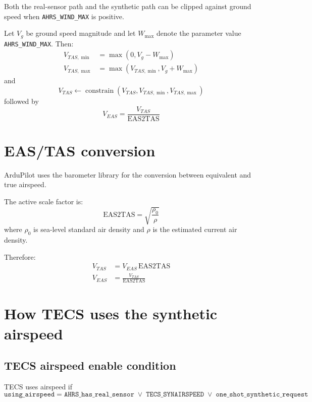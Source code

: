 \documentclass[11pt]{article}
\begin{document}
Both the real-sensor path and the synthetic path can be clipped against ground speed when \texttt{AHRS\_WIND\_MAX} is positive.

Let $V_g$ be ground speed magnitude and let $W_{\max}$ denote the parameter value \texttt{AHRS\_WIND\_MAX}. Then:
\begin{align}
V_{TAS,\min} &= \max(0, V_g - W_{\max}) \\
V_{TAS,\max} &= \max(V_{TAS,\min}, V_g + W_{\max})
\end{align}
and
\begin{equation}
V_{TAS} \leftarrow \operatorname{constrain}(V_{TAS}, V_{TAS,\min}, V_{TAS,\max})
\end{equation}
followed by
\begin{equation}
V_{EAS} = \frac{V_{TAS}}{\text{EAS2TAS}}
\end{equation}

\section{EAS/TAS conversion}

ArduPilot uses the barometer library for the conversion between equivalent and true airspeed.

The active scale factor is:
\begin{equation}
\text{EAS2TAS} = \sqrt{\frac{\rho_0}{\rho}}
\end{equation}
where $\rho_0$ is sea-level standard air density and $\rho$ is the estimated current air density.

Therefore:
\begin{align}
V_{TAS} &= V_{EAS}\,\text{EAS2TAS} \\
V_{EAS} &= \frac{V_{TAS}}{\text{EAS2TAS}}
\end{align}

\section{How TECS uses the synthetic airspeed}

\subsection{TECS airspeed enable condition}

TECS uses airspeed if
\begin{equation}
\texttt{using\_airspeed} =
\texttt{AHRS\_has\_real\_sensor}
\;\vee\;
\texttt{TECS\_SYNAIRSPEED}
\;\vee\;
\texttt{one\_shot\_synthetic\_request}
\end{equation}
\end{document}
